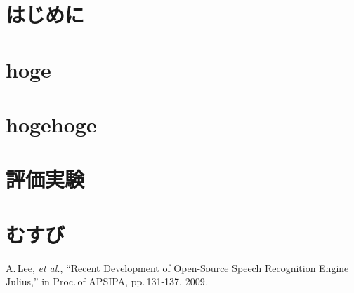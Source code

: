 \documentclass[a4j,twoside]{jarticle}
\begin{document}
\twocolumn[\vspace*{23mm}]     %
\begin{論文概要}              %
\setcounter{page}{1}          %


\setlength{\baselineskip}{4.5mm}
\section{はじめに}

\section{hoge}

\section{hogehoge}

\section{評価実験}

\section{むすび}

 \begin{small}
 \begin{thebibliography}{9}
A.\,Lee, {\itshape et al.}, ``Recent Development of Open-Source Speech Recognition Engine Julius,'' in Proc.\,of APSIPA, pp.\,131-137, 2009.
\end{thebibliography}
 \end{small}
\clearpage                       %
\end{論文概要}                   %
\end{document}
